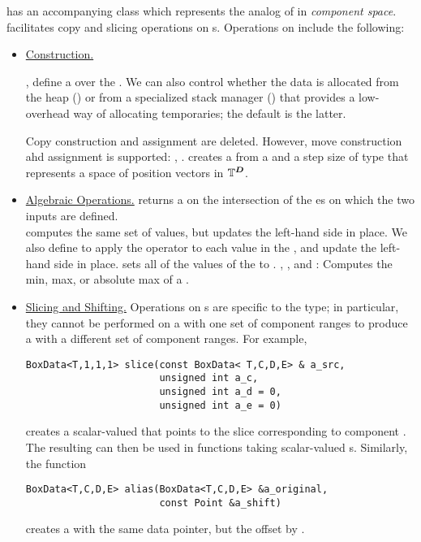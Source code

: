 \documentclass[12pt]{article}
\newcommand{\lhs}{left-hand side }
\newcommand{\BoxData}{\code{BoxData} }
\begin{document}
 has an accompanying class  which represents the analog of  in \textit{component space}.  facilitates copy and slicing operations on s.
Operations on \BoxData include the following:

\begin{itemize}
\item \underline{Construction.}

,  define a  over the . 
We can also control whether the data is allocated from the heap () or from a specialized stack manager () that provides a low-overhead way of allocating temporaries; the default is the latter.

Copy construction and assignment are deleted. However, move construction ahd assignment is supported:
, .
 creates a  from a  and a step size of type  that represents a space of position vectors in $\mathbb{T}^{\boldsymbol{D}}$.

\item \underline{Algebraic Operations.} 
 returns a  on the intersection of the es on which the two inputs are defined. \\  computes the same set of values, but updates the \lhs in place. We also define  to apply the operator to each value in the , and update the \lhs in place.  sets all of the values of the  to . , , and : Computes the min, max, or absolute max of a .
\item
\underline{Slicing and Shifting.}
Operations on s are specific to the type; in particular, they cannot be performed on a  with one set of component ranges to produce a  with a different set of component ranges. For example, 
\begin{verbatim}
BoxData<T,1,1,1> slice(const BoxData< T,C,D,E> & a_src, 
                       unsigned int a_c, 
                       unsigned int a_d = 0,
                       unsigned int a_e = 0)
\end{verbatim}
creates a scalar-valued  that points to the slice corresponding to component . The resulting  can then be used in functions taking scalar-valued s. Similarly, the function 
\begin{verbatim}
BoxData<T,C,D,E> alias(BoxData<T,C,D,E> &a_original, 
                       const Point &a_shift) 
\end{verbatim}
creates a  with the same data pointer, but the  offset by . 

\end{itemize}
\end{document}
